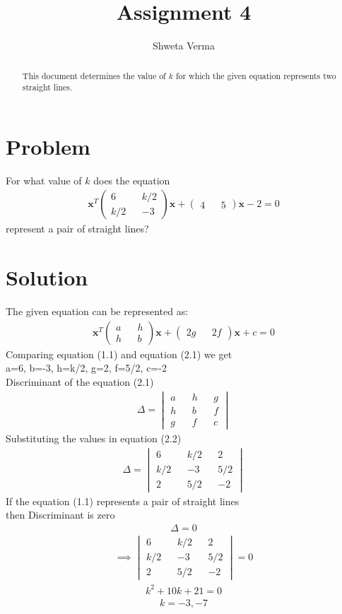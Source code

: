 \documentclass[journal,13pt,twocolumn]{IEEEtran}
\newcommand{\myvec}[1]{\ensuremath{\begin{pmatrix}#1\end{pmatrix}}}
\newcommand{\mydet}[1]{\ensuremath{\begin{vmatrix}#1\end{vmatrix}}}
\renewcommand{\vec}[1]{\mathbf{#1}}
\begin{document}
\title{Assignment 4} 
\author{Shweta Verma} 
\maketitle
\newpage
\bigskip
\begin{abstract}
This document determines the value of $k$ for which the given equation represents two straight lines.
\end{abstract}
\section{\textbf{Problem}}
For what value of $k$ does the equation 
\begin{align}
\vec{x}^T \myvec{6 && k/2 \\ k/2 && -3} \vec{x} + \myvec{4 && 5}\vec{x} -2 = 0
\end{align}
represent a pair of straight lines?
\section{\textbf{Solution}}
The given equation can be represented as:
\begin{align}
\vec{x}^T \myvec{a && h \\ h && b} \vec{x} + \myvec{2g && 2f}\vec{x} +c = 0
\end{align}
Comparing equation (1.1) and equation (2.1) we get\\
a=6, b=-3, h=k/2, g=2, f=5/2, c=-2\\
Discriminant of the equation (2.1)
\begin{align}
\Delta = \mydet{a && h && g\\ h && b && f\\ g && f && c}
\end{align}
Substituting the values in equation (2.2)
\begin{align}
\Delta = \mydet{6 && k/2 && 2\\ k/2 && -3 && 5/2\\2 && 5/2 && -2}
\end{align}
If the equation (1.1) represents a pair of straight lines\\
then Discriminant is zero
\begin{align}
\Delta = 0
\end{align}
\begin{align}
\implies \mydet{6 && k/2 && 2\\ k/2 && -3 && 5/2\\2 && 5/2 && -2} = 0
\end{align}
\begin{align}
k^2 + 10k + 21 = 0
\end{align}
\begin{align}
k = -3,-7
\end{align}
\end{document}
